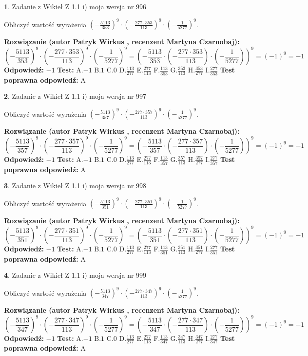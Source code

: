 \documentclass[12pt, a4paper]{article}
\theoremstyle{definition} %
\newtheorem{zad}{}
\newcommand{\zadStart}[1]{\begin{zad}#1\newline}
\newcommand{\zadStop}{\end{zad}}
\newcommand{\rozwStart}[2]{\noindent \textbf{Rozwiązanie (autor #1 , recenzent #2): }\newline}
\newcommand{\rozwStop}{\newline}
\newcommand{\odpStart}{\noindent \textbf{Odpowiedź:}\newline}
\newcommand{\odpStop}{\newline}
\newcommand{\testStart}{\noindent \textbf{Test:}\newline}
\newcommand{\testStop}{\newline}
\newcommand{\kluczStart}{\noindent \textbf{Test poprawna odpowiedź:}\newline}
\newcommand{\kluczStop}{\newline}
\begin{document}
\zadStart{Zadanie z Wikieł Z 1.1 i) moja wersja nr 996}

Obliczyć wartość wyrażenia $(-\frac{5113}{353})^{9} \cdot (-\frac{277 \cdot 353}{113})^{9} \cdot (-\frac{1}{5277})^{9}$.
\zadStop
\rozwStart{Patryk Wirkus}{Martyna Czarnobaj}
$$(-\frac{5113}{353})^{9} \cdot (-\frac{277 \cdot 353}{113})^{9} \cdot (-\frac{1}{5277})^{9} = (-\frac{5113}{353} \cdot (-\frac{277 \cdot 353}{113}) \cdot (-\frac{1}{5277}))^{9} = (-1)^{9} = -1$$
\rozwStop
\odpStart
$-1$
\odpStop
\testStart
A.$-1$ B.$1$ C.$0$ D.$\frac{113}{277}$ E.$\frac{277}{113}$
F.$\frac{113}{353}$ G.$\frac{353}{113}$
H.$\frac{353}{277}$
I.$\frac{277}{353}$
\testStop
\kluczStart
A
\kluczStop



\zadStart{Zadanie z Wikieł Z 1.1 i) moja wersja nr 997}

Obliczyć wartość wyrażenia $(-\frac{5113}{357})^{9} \cdot (-\frac{277 \cdot 357}{113})^{9} \cdot (-\frac{1}{5277})^{9}$.
\zadStop
\rozwStart{Patryk Wirkus}{Martyna Czarnobaj}
$$(-\frac{5113}{357})^{9} \cdot (-\frac{277 \cdot 357}{113})^{9} \cdot (-\frac{1}{5277})^{9} = (-\frac{5113}{357} \cdot (-\frac{277 \cdot 357}{113}) \cdot (-\frac{1}{5277}))^{9} = (-1)^{9} = -1$$
\rozwStop
\odpStart
$-1$
\odpStop
\testStart
A.$-1$ B.$1$ C.$0$ D.$\frac{113}{277}$ E.$\frac{277}{113}$
F.$\frac{113}{357}$ G.$\frac{357}{113}$
H.$\frac{357}{277}$
I.$\frac{277}{357}$
\testStop
\kluczStart
A
\kluczStop



\zadStart{Zadanie z Wikieł Z 1.1 i) moja wersja nr 998}

Obliczyć wartość wyrażenia $(-\frac{5113}{351})^{9} \cdot (-\frac{277 \cdot 351}{113})^{9} \cdot (-\frac{1}{5277})^{9}$.
\zadStop
\rozwStart{Patryk Wirkus}{Martyna Czarnobaj}
$$(-\frac{5113}{351})^{9} \cdot (-\frac{277 \cdot 351}{113})^{9} \cdot (-\frac{1}{5277})^{9} = (-\frac{5113}{351} \cdot (-\frac{277 \cdot 351}{113}) \cdot (-\frac{1}{5277}))^{9} = (-1)^{9} = -1$$
\rozwStop
\odpStart
$-1$
\odpStop
\testStart
A.$-1$ B.$1$ C.$0$ D.$\frac{113}{277}$ E.$\frac{277}{113}$
F.$\frac{113}{351}$ G.$\frac{351}{113}$
H.$\frac{351}{277}$
I.$\frac{277}{351}$
\testStop
\kluczStart
A
\kluczStop



\zadStart{Zadanie z Wikieł Z 1.1 i) moja wersja nr 999}

Obliczyć wartość wyrażenia $(-\frac{5113}{347})^{9} \cdot (-\frac{277 \cdot 347}{113})^{9} \cdot (-\frac{1}{5277})^{9}$.
\zadStop
\rozwStart{Patryk Wirkus}{Martyna Czarnobaj}
$$(-\frac{5113}{347})^{9} \cdot (-\frac{277 \cdot 347}{113})^{9} \cdot (-\frac{1}{5277})^{9} = (-\frac{5113}{347} \cdot (-\frac{277 \cdot 347}{113}) \cdot (-\frac{1}{5277}))^{9} = (-1)^{9} = -1$$
\rozwStop
\odpStart
$-1$
\odpStop
\testStart
A.$-1$ B.$1$ C.$0$ D.$\frac{113}{277}$ E.$\frac{277}{113}$
F.$\frac{113}{347}$ G.$\frac{347}{113}$
H.$\frac{347}{277}$
I.$\frac{277}{347}$
\testStop
\kluczStart
A
\kluczStop
\end{document}
